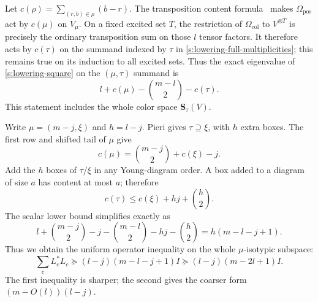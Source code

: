 Let \(c(\rho)=\sum_{(r,b)\in\rho}(b-r)\).  The transposition content
formula~\cite[Eq.~(2.1), Proposition~5.3, and Theorem~5.8]{VershikOkounkov2005} makes
\(\Omega_{\mathrm{pos}}\) act by \(c(\mu)\) on \(V_\mu\).
On a fixed excited set \(T\), the restriction of
\(\Omega_{\mathrm{col}}\) to \(V^{\otimes T}\) is precisely the
ordinary transposition sum on those \(l\) tensor factors.  It therefore
acts by \(c(\tau)\) on the summand indexed by \(\tau\) in
\eqref{s:lowering-full-multiplicities}; this remains true on its
induction to all excited sets.  Thus the exact eigenvalue of
\eqref{s:lowering-square} on the \((\mu,\tau)\) summand is
\[
 l+c(\mu)-\binom{m-l}{2}-c(\tau).
\]
This statement includes the whole color space \(\mathbf S_\tau(V)\).

Write \(\mu=(m-j,\xi)\) and \(h=l-j\).  Pieri gives
\(\tau\supseteq\xi\), with \(h\) extra boxes.  The first row and shifted
tail of \(\mu\) give
\[
 c(\mu)=\binom{m-j}{2}+c(\xi)-j.
\]
Add the \(h\) boxes of \(\tau/\xi\) in any Young-diagram order.  A
box added to a diagram of size \(a\) has content at most \(a\);
therefore
\[
 c(\tau)\le c(\xi)+hj+\binom h2 .
\]
The scalar lower bound simplifies exactly as
\[
 l+\binom{m-j}{2}-j-\binom{m-l}{2}-hj-\binom h2
       =h(m-l-j+1).
\]
Thus we obtain the uniform operator inequality
on the whole \(\mu\)-isotypic subspace:
\begin{equation}\label{s:lowering-one-step}
 \sum_cL_c^*L_c
 \succeq(l-j)(m-l-j+1)I
 \succeq(l-j)(m-2l+1)I .
\end{equation}
The first inequality is sharper; the second gives the coarser form
\((m-O(l))(l-j)\).

